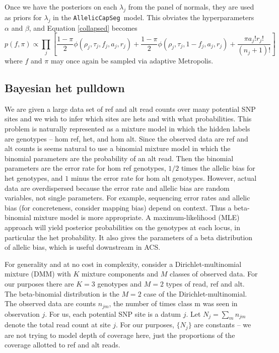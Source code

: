 \documentclass[nofootinbib,amssymb,amsmath]{revtex4}
\newcommand{\ACS}{\texttt{AllelicCapSeg}}
\begin{document}
Once we have the posteriors on each $\lambda_j$ from the panel of normals, they are used as priors for $\lambda_j$ in the \ACS~model.  This obviates the hyperparameters $\alpha$ and $\beta$, and Equation \ref{collapsed} becomes
%
\begin{equation}
p(f, \pi) \propto \prod_j 
\left[    \frac{1-\pi}{2} \phi(\rho_j, \tau_j, f_j, a_j, r_j)  +
\frac{1-\pi}{2} \phi(\rho_j, \tau_j, 1 - f_j, a_j, r_j)  +
 \frac{ \pi a_j! r_j!}{(n_j + 1)!}    \right]
 \label{collapsed_using_pon}
\end{equation}
%
where $f$ and $\pi$ may once again be sampled via adaptive Metropolis.


\subsection{Bayesian het pulldown} \label{bayesian-het-pulldown}

We are given a large data set of ref and alt read counts over many potential SNP sites and we wish to infer which sites are hets and with what probabilities.  This problem is naturally represented as a mixture model in which the hidden labels are genotypes -- hom ref, het, and hom alt.  Since the observed data are ref and alt counts is seems natural to use a binomial mixture model in which the binomial parameters are the probability of an alt read.  Then the binomial parameters are the error rate for hom ref genotypes, $1/2$ times the allelic bias for het genotypes, and $1$ minus the error rate for hom alt genotypes.  However, actual data are overdispersed because the error rate and allelic bias are random variables, not single parameters.  For example, sequencing error rates and allelic bias (for concreteness, consider mapping bias) depend on context.  Thus a beta-binomial mixture model is more appropriate.  A maximum-likelihood (MLE) approach will yield posterior probabilities on the genotypes at each locus, in particular the het probability.  It also gives the parameters of a beta distribution of allelic bias, which is useful downstream in ACS.

For generality and at no cost in complexity, consider a Dirichlet-multinomial mixture (DMM) with $K$ mixture components and $M$ classes of observed data.  For our purposes there are $K = 3$ genotypes and $M = 2$ types of read, ref and alt.  The beta-binomial distribution is the $M = 2$ case of the Dirichlet-multinomial.  The observed data are counts $n_{jm}$, the number of times class m was seen in observation $j$.  For us, each potential SNP site is a datum $j$.  Let $N_j = \sum_m n_{jm}$ denote the total read count at site $j$.  For our purposes, $\{ N_j \}$ are constants -- we are not trying to model depth of coverage here, just the proportions of the coverage allotted to ref and alt reads.
\end{document}
